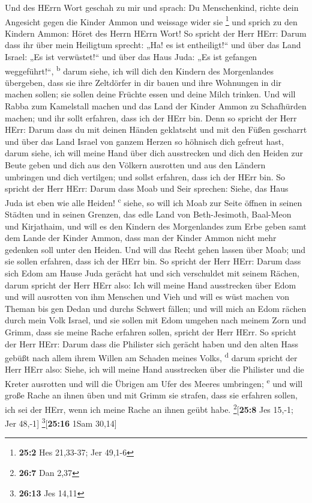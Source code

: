  Und des HErrn Wort geschah zu mir und sprach:
 Du Menschenkind, richte dein Angesicht gegen die Kinder
Ammon und weissage wider sie \footnote{\textbf{25:2} Hes 21,33-37; Jer
  49,1-6}  und sprich zu den Kindern Ammon: Höret des
Herrn HErrn Wort! So spricht der Herr HErr: Darum dass ihr über mein
Heiligtum sprecht: „Ha! es ist entheiligt!{}`` und über das Land Israel:
„Es ist verwüstet!{}`` und über das Haus Juda: „Es ist gefangen
weggeführt!{}``, \textsuperscript{b}  darum siehe, ich
will dich den Kindern des Morgenlandes übergeben, dass sie ihre
Zeltdörfer in dir bauen und ihre Wohnungen in dir machen sollen; sie
sollen deine Früchte essen und deine Milch trinken.  Und
will Rabba zum Kamelstall machen und das Land der Kinder Ammon zu
Schafhürden machen; und ihr sollt erfahren, dass ich der HErr bin.
 Denn so spricht der Herr HErr: Darum dass du mit deinen
Händen geklatscht und mit den Füßen gescharrt und über das Land Israel
von ganzem Herzen so höhnisch dich gefreut hast,  darum
siehe, ich will meine Hand über dich ausstrecken und dich den Heiden zur
Beute geben und dich aus den Völkern ausrotten und aus den Ländern
umbringen und dich vertilgen; und sollst erfahren, dass ich der HErr
bin.  So spricht der Herr HErr: Darum dass Moab und Seir
sprechen: Siehe, das Haus Juda ist eben wie alle Heiden!
\textsuperscript{c}  siehe, so will ich Moab zur Seite
öffnen in seinen Städten und in seinen Grenzen, das edle Land von
Beth-Jesimoth, Baal-Meon und Kirjathaim,  und will es den
Kindern des Morgenlandes zum Erbe geben samt dem Lande der Kinder Ammon,
dass man der Kinder Ammon nicht mehr gedenken soll unter den Heiden.
 Und will das Recht gehen lassen über Moab; und sie
sollen erfahren, dass ich der HErr bin.  So spricht der
Herr HErr: Darum dass sich Edom am Hause Juda gerächt hat und sich
verschuldet mit seinem Rächen,  darum spricht der Herr
HErr also: Ich will meine Hand ausstrecken über Edom und will ausrotten
von ihm Menschen und Vieh und will es wüst machen von Theman bis gen
Dedan und durchs Schwert fällen;  und will mich an Edom
rächen durch mein Volk Israel, und sie sollen mit Edom umgehen nach
meinem Zorn und Grimm, dass sie meine Rache erfahren sollen, spricht der
Herr HErr.  So spricht der Herr HErr: Darum dass die
Philister sich gerächt haben und den alten Hass gebüßt nach allem ihrem
Willen am Schaden meines Volks, \textsuperscript{d} 
darum spricht der Herr HErr also: Siehe, ich will meine Hand ausstrecken
über die Philister und die Kreter ausrotten und will die Übrigen am Ufer
des Meeres umbringen; \textsuperscript{e}  und will große
Rache an ihnen üben und mit Grimm sie strafen, dass sie erfahren sollen,
ich sei der HErr, wenn ich meine Rache an ihnen geübt habe.
\footnote{\textbf{26:7} Dan 2,37}{[}\textbf{25:8} Jes 15,-1; Jer
48,-1{]} \footnote{\textbf{26:13} Jes 14,11}{[}\textbf{25:16} 1Sam
30,14{]}

